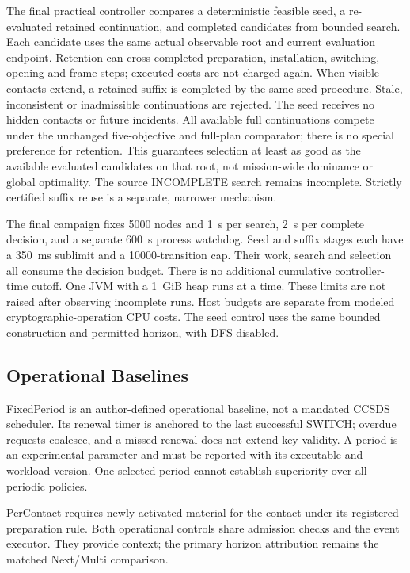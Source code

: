 \documentclass[conference]{IEEEtran}
\begin{document}
The final practical controller compares a deterministic feasible seed, a re-evaluated retained continuation, and completed candidates from bounded search. Each candidate uses the same actual observable root and current evaluation endpoint. Retention can cross completed preparation, installation, switching, opening and frame steps; executed costs are not charged again. When visible contacts extend, a retained suffix is completed by the same seed procedure. Stale, inconsistent or inadmissible continuations are rejected. The seed receives no hidden contacts or future incidents. All available full continuations compete under the unchanged five-objective and full-plan comparator; there is no special preference for retention. This guarantees selection at least as good as the available evaluated candidates on that root, not mission-wide dominance or global optimality. The source INCOMPLETE search remains incomplete. Strictly certified suffix reuse is a separate, narrower mechanism.

The final campaign fixes 5000 nodes and 1~s per search, 2~s per complete decision, and a separate 600~s process watchdog. Seed and suffix stages each have a 350~ms sublimit and a 10000-transition cap. Their work, search and selection all consume the decision budget. There is no additional cumulative controller-time cutoff. One JVM with a 1~GiB heap runs at a time. These limits are not raised after observing incomplete runs. Host budgets are separate from modeled cryptographic-operation CPU costs. The seed control uses the same bounded construction and permitted horizon, with DFS disabled.

\subsection{Operational Baselines}
FixedPeriod is an author-defined operational baseline, not a mandated CCSDS scheduler. Its renewal timer is anchored to the last successful SWITCH; overdue requests coalesce, and a missed renewal does not extend key validity. A period is an experimental parameter and must be reported with its executable and workload version. One selected period cannot establish superiority over all periodic policies.

PerContact requires newly activated material for the contact under its registered preparation rule. Both operational controls share admission checks and the event executor. They provide context; the primary horizon attribution remains the matched Next/Multi comparison.
\end{document}
